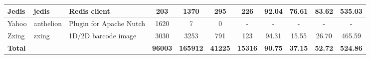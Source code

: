 \begin{table*}[]
{\begin{tabular}{lllcccccccc}
Jedis                       & jedis                                                         & Redis client                                                              & 203            & 1370            & 295                                                                   & 226            & 92.04          & 76.61          & 83.62          & 535.03                                               \\ \hline
Yahoo                       & anthelion                                                     & Plugin for Apache Nutch                                                   & 1620           & 7               & 0                                                                     &         -       &        -        &           -     &           -     &              -                                        \\ \hline
Zxing                       & zxing                                                         & 1D/2D barcode image                                                       & 3030           & 3253            & 791                                                                   & 123            & 94.31          & 15.55          & 26.70          & 465.59                                               \\ \hline
\textbf{Total}              & \textbf{}                                                     & \textbf{}                                                                 & \textbf{96003} & \textbf{165912} & \textbf{41225}                                                        & \textbf{15316} & \textbf{90.75} & \textbf{37.15} & \textbf{52.72} & \textbf{524.86}                                      \\ \hline \hline
\end{tabular}%
}
\end{table*}